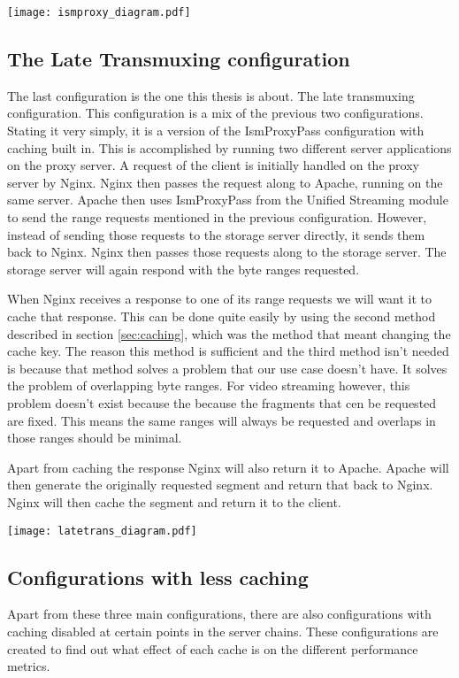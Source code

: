 \documentclass[twoside,openright]{uva-bachelor-thesis}
\begin{document}
\texttt{[image: ismproxy\_diagram.pdf]}



\subsection{The Late Transmuxing configuration}
The last configuration is the one this thesis is about. The late transmuxing
configuration. This configuration is a mix of the previous two configurations.
Stating it very simply, it is a version of the IsmProxyPass configuration with
caching built in. This is accomplished by running two different server
applications on the proxy server. A request of the client is initially handled
on the proxy server by Nginx. Nginx then passes the request along to Apache,
running on the same server. Apache then uses IsmProxyPass from the Unified
Streaming module to send the range requests mentioned in the previous
configuration.  However, instead of sending those requests to the storage server
directly, it sends them back to Nginx. Nginx then passes those requests along to
the storage server. The storage server will again respond with the byte ranges
requested.

When Nginx receives a response to one of its range requests we will want it to
cache that response. This can be done quite easily by using the second method
described in section \ref{sec:caching}, which was the method that meant changing
the cache key. The reason this method is sufficient and the third method isn't
needed is because that method solves a problem that our use case doesn't have.
It solves the problem of overlapping byte ranges. For video streaming however,
this problem doesn't exist because the because the fragments that cen be
requested are fixed. This means the same ranges will always be requested and
overlaps in those ranges should be minimal.

Apart from caching the response Nginx will also return it to Apache. Apache will
then generate the originally requested segment and return that back to Nginx.
Nginx will then cache the segment and return it to the client.

\texttt{[image: latetrans\_diagram.pdf]}



\subsection{Configurations with less caching}
Apart from these three main configurations, there are also configurations
with caching disabled at certain points in the server chains. These
configurations are created to find out what effect of each cache is on the
different performance metrics.
\end{document}
